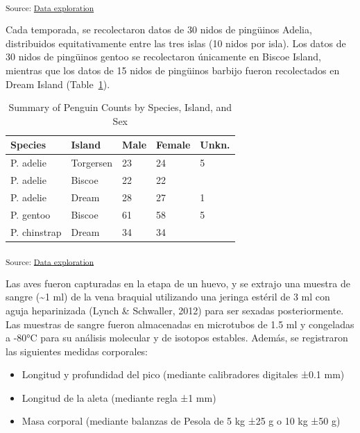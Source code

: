 \documentclass[
]{agujournal2019}
\providecommand{\tightlist}{%
  \setlength{\itemsep}{0pt}\setlength{\parskip}{0pt}}\usepackage{longtable,booktabs,array}
\begin{document}
\textsubscript{Source:
\href{https://sofiazorrilla.github.io/taller_quarto_ms/notebooks/DataExploration-preview.html\#cell-fig-mapa-distribucion}{Data
exploration}}

Cada temporada, se recolectaron datos de 30 nidos de pingüinos Adelia,
distribuidos equitativamente entre las tres islas (10 nidos por isla).
Los datos de 30 nidos de pingüinos gentoo se recolectaron únicamente en
Biscoe Island, mientras que los datos de 15 nidos de pingüinos barbijo
fueron recolectados en Dream Island (Table~\ref{tbl-sampling}).

\begin{longtable}[]{@{}lllll@{}}

\caption{\label{tbl-sampling}Summary of Penguin Counts by Species,
Island, and Sex}

\tabularnewline

\toprule\noalign{}
Species & Island & Male & Female & Unkn. \\
\midrule\noalign{}
\endhead
\bottomrule\noalign{}
\endlastfoot
P. adelie & Torgersen & 23 & 24 & 5 \\
P. adelie & Biscoe & 22 & 22 & \\
P. adelie & Dream & 28 & 27 & 1 \\
P. gentoo & Biscoe & 61 & 58 & 5 \\
P. chinstrap & Dream & 34 & 34 & \\

\end{longtable}

\textsubscript{Source:
\href{https://sofiazorrilla.github.io/taller_quarto_ms/notebooks/DataExploration-preview.html\#cell-tbl-sampling}{Data
exploration}}

Las aves fueron capturadas en la etapa de un huevo, y se extrajo una
muestra de sangre (\textasciitilde1 ml) de la vena braquial utilizando
una jeringa estéril de 3 ml con aguja heparinizada (Lynch \& Schwaller,
2012) para ser sexadas posteriormente. Las muestras de sangre fueron
almacenadas en microtubos de 1.5 ml y congeladas a -80°C para su
análisis molecular y de isotopos estables. Además, se registraron las
siguientes medidas corporales:

\begin{itemize}
\tightlist
\item
  Longitud y profundidad del pico (mediante calibradores digitales ±0.1
  mm)\\
\item
  Longitud de la aleta (mediante regla ±1 mm)\\
\item
  Masa corporal (mediante balanzas de Pesola de 5 kg ±25 g o 10 kg ±50
  g)
\end{itemize}
\end{document}
